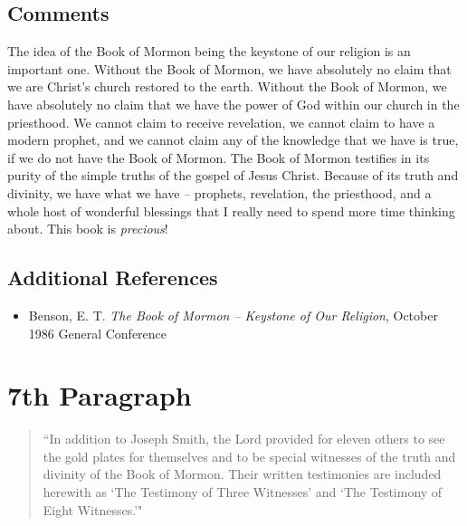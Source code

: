 \documentclass[12pt]{report}
\begin{document}
\subsection{Comments\label{intro:comments6}}
The idea of the Book of Mormon being the keystone of our religion is an important one.  Without the Book of Mormon, we have absolutely no claim that we are Christ's church restored to the earth.  Without the Book of Mormon, we have absolutely no claim that we have the power of God within our church in the priesthood.  We cannot claim to receive revelation, we cannot claim to have a modern prophet, and we cannot claim any of the knowledge that we have is true, if we do not have the Book of Mormon.  The Book of Mormon testifies in its purity of the simple truths of the gospel of Jesus Christ.  Because of its truth and divinity, we have what we have -- prophets, revelation, the priesthood, and a whole host of wonderful blessings that I really need to spend more time thinking about.  This book is \emph{precious}!

\subsection{Additional References\label{intro:references6}}
\begin{itemize}
\item Benson, E. T. \emph{The Book of Mormon -- Keystone of Our Religion}, October 1986 General Conference
\end{itemize}

\section{7th Paragraph\label{intro:7th}}
\begin{center}
\begin{quote}
``In addition to Joseph Smith, the Lord provided for eleven others to see the gold plates for themselves and to be special witnesses of the truth and divinity of the Book of Mormon.  Their written testimonies are included herewith as `The Testimony of Three Witnesses' and `The Testimony of Eight Witnesses.'"
\end{quote}
\end{center}
\end{document}
